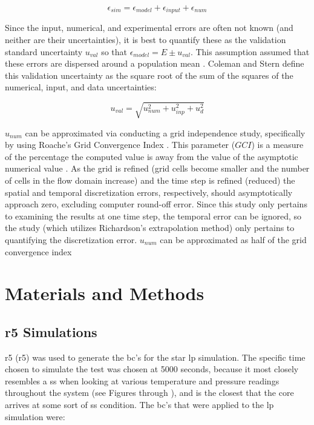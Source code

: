 \documentclass[double,12pt]{beavtex}
\begin{document}
\begin{equation}
    \epsilon_{sim} = \epsilon_{model} + \epsilon_{input} + \epsilon_{num}
\label{eq:Sim_Error_Quantified}
\end{equation}

Since the input, numerical, and experimental errors are often not known (and neither are their uncertainties), it is best to quantify these as the validation standard uncertainty $u_{val}$ so that $\epsilon_{model}=E \pm u_{val}$. This assumption assumed that these errors are dispersed around a population mean \cite{TestUncertainty}. Coleman and Stern \cite{coleman_stern_1997} define this validation uncertainty as the square root of the sum of the squares of the numerical, input, and data uncertainties:

\begin{equation}
    u_{val} = \sqrt{u_{num}^{2} + u_{inp}^{2} + u_{d}^{2}}
\label{eq:Validation_Uncertainty}
\end{equation}

$u_{num}$ can be approximated via conducting a grid independence study, specifically by using Roache's Grid Convergence Index \cite{vandv}. This parameter ($GCI$) is a measure of the percentage the computed value is away from the value of the asymptotic numerical value \cite{slater_2021}. As the grid is refined (grid cells become smaller and the number of cells in the flow domain increase) and the time step is refined (reduced) the spatial and temporal discretization errors, respectively, should asymptotically approach zero, excluding computer round-off error. Since this study only pertains to examining the results at one time step, the temporal error can be ignored, so the study (which utilizes Richardson's extrapolation method) only pertains to quantifying the discretization error. $u_{num}$ can be approximated as half of the grid convergence index 



\chapter{Materials and Methods}

\section{\acrshort{r5} Simulations}

\acrshort{r5} (\acrshort{r5}) was used to generate the \acrshort{bc}'s for the \acrshort{star} \acrshort{lp} simulation. The specific time chosen to simulate the test was chosen at 5000 seconds, because it most closely resembles a \acrshort{ss} when looking at various temperature and pressure readings throughout the system (see Figures  through ), and is the closest that the core arrives at some sort of \acrshort{ss} condition. The \acrshort{bc}'s that were applied to the \acrshort{lp} simulation were:
\end{document}
